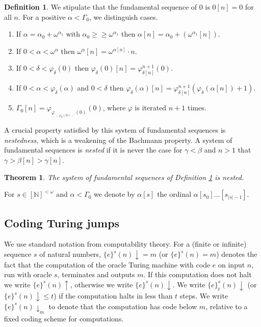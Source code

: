 \documentclass[11pt]{amsart}
\newtheorem{theorem}[thm]{Theorem}
\theoremstyle{definition}
\newtheorem{definition}[thm]{Definition}
\theoremstyle{remark}
\theoremstyle{plain}
\newcommand{\numberset}{\mathbb}
\newcommand{\N}{\numberset{N}}
\def\om{\omega}
\def\a{\alpha}
\def\b{\beta}
\def\G{\Gamma}
\def\g{\gamma}
\def\d{\delta}
\def\ggeq{\mathrel{\geq\!\!\!\geq}}
\def\N{{\mathbb{N}}}
\begin{document}
\begin{definition}\label{system of fund seq}
We stipulate that the fundamental sequence of $0$ is $0[n] = 0$ for all $n$.
For a positive $\a < \G_0$, we distinguish cases.
\begin{enumerate}
	\item If $\a = \a_0 + \om^{\a_1}$ with $\a_0 \ggeq \om^{\a_1}$ then $\a [n] = \a_0 + (\om^{\a_1} [n])$.
	\item If $0 < \a < \om^\a$ then $\om^\a [n] = \om^{\a [n]} \cdot n$.
	\item If $0 < \d < \varphi_\d (0)$ then $\varphi_{\d} (0) [n] = \varphi_{\d [n]}^{n + 1} (0)$.
	\item If $0 < \a < \varphi_\d (\a)$ and $0 < \d$ then $\varphi_{\d} (\a) [n] = \varphi_{\d [n]}^{n+1}(\varphi_{\d}(\a [n]) + 1)$.
    \item $\G_0 [n] = \varphi_{\varphi_{\ddots \varphi_0 (0) \iddots} (0)} (0)$, where $\varphi$ is iterated $n+1$ times.
\end{enumerate}
\end{definition}

A crucial property satisfied by this system of fundamental sequences is {\em nestedness}, which is a weakening of the Bachmann property.
A system of fundamental sequences is {\em nested} if it is never the case for $\g < \b$ and $n > 1$ that $\g > \b[n] > \g[n]$.
 
\begin{theorem}\label{nested}\cite[Theorem 2.16]{marcone2025}
The system of fundamental sequences of Definition \ref{system of fund seq} is nested.
\end{theorem}

For $s\in[\N]^{<\om}$ and $\a < \G_0$ 
we denote by $\a[s]$ 
the ordinal $\a[s_0] \ldots [s_{|s|-1}]$. 

%
%

\subsection{Coding Turing jumps}\label{subsec: turing jump}

%
%

We use standard notation from computability theory. 
For a (finite or infinite) sequence $s$ of natural numbers, $\{e\}^s(n)\downarrow=m$ (or $\{e\}^s(n)=m$) denotes the fact that the computation of the oracle Turing machine with code $e$ on input $n$, run with oracle $s$, terminates and outputs $m$. 
If this computation does not halt we write $\{e\}^s(n)\uparrow$, otherwise we write $\{e\}^s(n)\downarrow$. 
We write $\{e\}^s_t(n)\downarrow$ (or $\{e\}^s(n)\downarrow\leq t$) if the computation halts in less than $t$ steps. 
We write $\{e\}^s(n)\downarrow_m$ to denote that the computation has code below $m$, relative to a fixed coding scheme for computations.  
\end{document}
